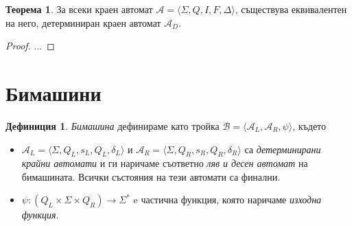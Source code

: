\documentclass[12pt, oneside]{article}
\theoremstyle{definition}
\newtheorem{definition}{Дефиниция}[section]
\newtheorem{theorem}{Теорема}[section]
\begin{document}
\begin{theorem}
	За всеки краен автомат \(\mathcal{A} = \langle \Sigma, Q, I, F, \Delta \rangle \), съществува еквивалентен на него, детерминиран краен автомат \( \mathcal{A}_D \).
	\begin{proof}
		...
		
	\end{proof}
\end{theorem}

\section{Бимашини}

\begin{definition}
	 \emph{Бимашина} дефинираме като тройка \( \mathcal{B} = \langle \mathcal{A}_L, \mathcal{A}_R, \psi \rangle \), където

	\begin{itemize}
		\item \( \mathcal{A}_L = \langle \Sigma, Q_L, s_L, Q_L, \delta_L \rangle \) и \( \mathcal{A}_R = \langle \Sigma, Q_R, s_R, Q_R, \delta_R \rangle \) са \emph{детерминирани крайни автомати} и ги наричаме съответно \emph{ляв и десен автомат} на бимашината. Всички състояния на тези автомати са финални.
		\item \( \psi:(Q_L \times \Sigma \times Q_R) \to \Sigma^* \) e частична функция, която наричаме \emph{изходна функция}.
	\end{itemize}
\end{definition}
\end{document}
